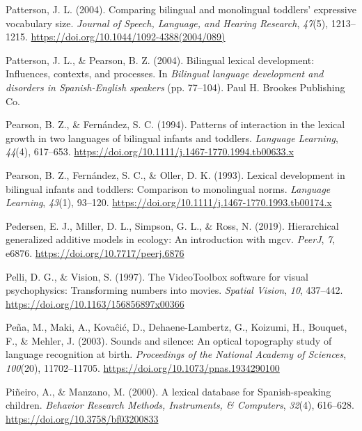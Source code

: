 \documentclass[
  12pt,
  b5paperpaper,
  twoside]{scrreprt}
\newlength{\cslhangindent}
\newlength{\cslentryspacingunit} %
\newenvironment{CSLReferences}[2] %
 {%
  \setlength{\parindent}{0pt}
  \ifodd #1
  \let\oldpar\par
  \def\par{\hangindent=\cslhangindent\oldpar}
  \fi
  \setlength{\parskip}{#2\cslentryspacingunit}
 }%
 {}
\begin{document}
\begin{CSLReferences}{1}{0}
\leavevmode{}%
Patterson, J. L. (2004). Comparing bilingual and monolingual toddlers'
expressive vocabulary size. \emph{Journal of Speech, Language, and
Hearing Research}, \emph{47}(5), 1213--1215.
\url{https://doi.org/10.1044/1092-4388(2004/089)}

\leavevmode{}%
Patterson, J. L., \& Pearson, B. Z. (2004). Bilingual lexical
development: Influences, contexts, and processes. In \emph{Bilingual
language development and disorders in {Spanish-English} speakers} (pp.
77--104). {Paul H. Brookes Publishing Co.}

\leavevmode{}%
Pearson, B. Z., \& Fernández, S. C. (1994). Patterns of interaction in
the lexical growth in two languages of bilingual infants and toddlers.
\emph{Language Learning}, \emph{44}(4), 617--653.
\url{https://doi.org/10.1111/j.1467-1770.1994.tb00633.x}

\leavevmode{}%
Pearson, B. Z., Fernández, S. C., \& Oller, D. K. (1993). Lexical
development in bilingual infants and toddlers: Comparison to monolingual
norms. \emph{Language Learning}, \emph{43}(1), 93--120.
\url{https://doi.org/10.1111/j.1467-1770.1993.tb00174.x}

\leavevmode{}%
Pedersen, E. J., Miller, D. L., Simpson, G. L., \& Ross, N. (2019).
Hierarchical generalized additive models in ecology: An introduction
with mgcv. \emph{PeerJ}, \emph{7}, e6876.
\url{https://doi.org/10.7717/peerj.6876}

\leavevmode{}%
Pelli, D. G., \& Vision, S. (1997). The {VideoToolbox} software for
visual psychophysics: Transforming numbers into movies. \emph{Spatial
Vision}, \emph{10}, 437--442.
\url{https://doi.org/10.1163/156856897x00366}

\leavevmode{}%
Peña, M., Maki, A., Kovaĉić, D., Dehaene-Lambertz, G., Koizumi, H.,
Bouquet, F., \& Mehler, J. (2003). Sounds and silence: An optical
topography study of language recognition at birth. \emph{Proceedings of
the National Academy of Sciences}, \emph{100}(20), 11702--11705.
\url{https://doi.org/10.1073/pnas.1934290100}

\leavevmode{}%
Piñeiro, A., \& Manzano, M. (2000). A lexical database for
{Spanish-speaking} children. \emph{Behavior Research Methods,
Instruments, \& Computers}, \emph{32}(4), 616--628.
\url{https://doi.org/10.3758/bf03200833}


\end{CSLReferences}
\end{document}
